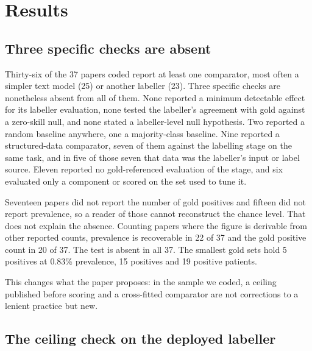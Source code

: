 \documentclass[review]{elsarticle}
\begin{document}
\section{Results}
\label{sec:results}

\subsection{Three specific checks are absent}
\label{sec:survey}

Thirty-six of the 37 papers coded report at least one comparator, most often a
simpler text model (25) or another labeller (23). Three specific checks are
nonetheless absent from all of them. None reported a minimum detectable effect
for its labeller evaluation, none tested the labeller's agreement with gold against a
zero-skill null, and none stated a labeller-level null hypothesis. Two reported a random baseline anywhere, one a majority-class baseline. Nine reported a structured-data comparator, seven of them against the
labelling stage on the same task, and in five of those seven that data
was the labeller's input or label source. Eleven reported no gold-referenced evaluation of the stage, and six evaluated
only a component or scored on the set used to tune it.

Seventeen papers did not report the number of
gold positives and fifteen did not report prevalence, so a reader of those cannot
reconstruct the chance level. That does not explain the absence. Counting
papers where the figure is derivable from other reported counts, prevalence is
recoverable in 22 of 37 and the gold positive count in 20 of 37. The test is absent in all 37. The smallest gold sets hold 5 positives at 0.83\% prevalence, 15 positives and
19 positive patients.

This changes what the paper proposes: in the sample we coded, a ceiling published
before scoring and a cross-fitted comparator are not corrections to a lenient
practice but new.

\subsection{The ceiling check on the deployed labeller}
\label{sec:res-ceiling}
\end{document}
